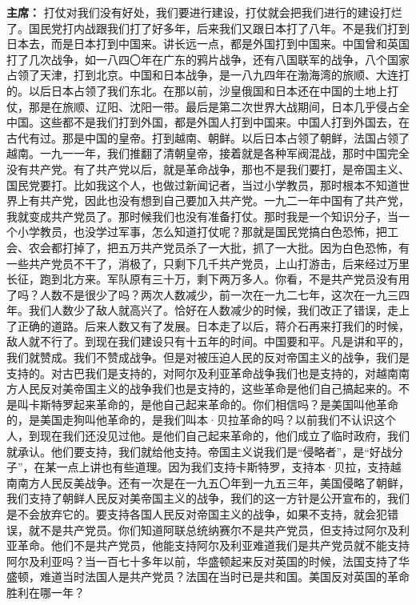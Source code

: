 \begin{list}{}
\item[\textbf{主席：}] 打仗对我们没有好处，我们要进行建设，打仗就会把我们进行的建设打烂了。国民党打内战跟我们打了好多年，后来我们又跟日本打了八年。不是我们打到日本去，而是日本打到中国来。讲长远一点，都是外国打到中国来。中国曾和英国打了几次战争，如一八四〇年在广东的鸦片战争，还有八国联军的战争，八个国家占领了天津，打到北京。中国和日本战争，是一八九四年在渤海湾的旅顺、大连打的。以后日本占领了我们东北。在那以前，沙皇俄国和日本还在中国的土地上打仗，那是在旅顺、辽阳、沈阳一带。最后是第二次世界大战期间，日本几乎侵占全中国。这些都不是我们打到外国，都是外国人打到中国来。中国人打到外国去，在古代有过。那是中国的皇帝。打到越南、朝鲜。以后日本占领了朝鲜，法国占领了越南。一九一一年，我们推翻了清朝皇帝，接着就是各种军阀混战，那时中国完全没有共产党。有了共产党以后，就是革命战争，那也不是我们要打，是帝国主义、国民党要打。比如我这个人，也做过新闻记者，当过小学教员，那时根本不知道世界上有共产党，因此也没有想到自己要加入共产党。一九二一年中国有了共产党，我就变成共产党员了。那时候我们也没有准备打仗。那时我是一个知识分子，当一个小学教员，也没学过军事，怎么知道打仗呢？那就是国民党搞白色恐怖，把工会、农会都打掉了，把五万共产党员杀了一大批，抓了一大批。因为白色恐怖，有一些共产党员不干了，消极了，只剩下几千共产党员，上山打游击，后来经过万里长征，跑到北方来。军队原有三十万，剩下两万多人。你看，不是共产党员没有用了吗？人数不是很少了吗？两次人数减少，前一次在一九二七年，这次在一九三四年。我们人数少了敌人就高兴了。恰好在人数减少的时候，我们改正了错误，走上了正确的道路。后来人数又有了发展。日本走了以后，蒋介石再来打我们的时候，敌人就不行了。到现在我们建设只有十五年的时间。中国要和平。凡是讲和平的，我们就赞成。我们不赞成战争。但是对被压迫人民的反对帝国主义的战争，我们是支持的。对古巴我们是支持的，对阿尔及利亚革命战争我们也是支持的，对越南南方人民反对美帝国主义的战争我们也是支持的，这些革命是他们自己搞起来的。不是叫卡斯特罗起来革命的，是他自己起来革命的。你们相信吗？是美国叫他革命的，是美国走狗叫他革命的，是我们叫本·贝拉革命的吗？以前我们不认识这个人，到现在我们还没见过他。是他们自己起来革命的，他们成立了临时政府，我们就承认。他们要支持，我们就给他支持。帝国主义说我们是“侵略者”，是“好战分子”，在某一点上讲也有些道理。因为我们支持卡斯特罗，支持本·贝拉，支持越南南方人民反美战争。还有一次是在一九五〇年到一九五三年，美国侵略了朝鲜，我们支持了朝鲜人民反对美帝国主义的战争，我们的这一方针是公开宣布的，我们是不会放弃它的。要支持各国人民反对帝国主义的战争，如果不支持，就会犯错误，就不是共产党员。你们知道阿联总统纳赛尔不是共产党员，但支持过阿尔及利亚革命。他们不是共产党员，他能支持阿尔及利亚难道我们是共产党员就不能支持阿尔及利亚吗？当一百七十多年以前，华盛顿起来反对英国的时候，法国支持了华盛顿，难道当时法国人是共产党员？法国在当时已是共和国。美国反对英国的革命胜利在哪一年？


\end{list}
